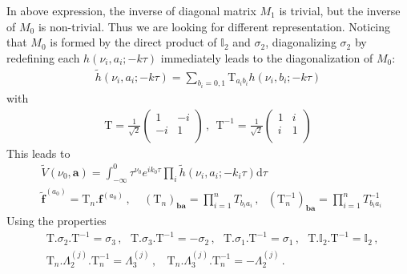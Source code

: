 \documentclass[a4paper,11pt]{article}
\newcommand{\nn}{\nonumber}
\newcommand{\nd}{\mathrm{d}}
\newcommand{\bea}{\begin{eqnarray}}
\newcommand{\eea}{\end{eqnarray}}
\begin{document}
In above expression, the inverse of diagonal matrix $M_1$ is trivial, but
the inverse of  $M_0$ is non-trivial. Thus we are looking for 
different representation.  Noticing that $M_0$ is formed by the direct product of $\mathbb{I}_2$ and $\sigma_2$, diagonalizing  $\sigma_2$ by redefining each $h(\nu_i,a_i;-k\tau)$ immediately leads to the diagonalization of $M_0$:
%
\bea \tilde{h}(\nu_i,a_i;-k\tau) = \sum_{b_i=0,1} \text{T}_{a_i b_i} h(\nu_i,b_i;-k\tau)\eea
% 
with
%
\bea \text{T}=\frac{1}{\sqrt{2}}\left(
\begin{array}{cc}
 1 & -i \\
 -i & 1 \\
\end{array}
\right)\, , ~~\text{T}^{-1}=\frac{1}{\sqrt{2}}\left(
\begin{array}{cc}
 1 & i \\
 i & 1 \\
\end{array}
\right)  \label{eq:T}\eea
%
This leads to
\begin{align}
&\tilde{V}(\nu_0,\bm{a})=\int_{-\infty}^0 \tau^{\nu_0} e^{ik_0 \tau} 
  \prod_i \tilde{h}(\nu_i,a_i;-k_i\tau)\nd \tau \nn\\
&\tilde{\bm{f}}^{(a_0)}=\text{T}_n.\bm{f}^{(a_0)}\, , ~~~~~\left(\text{T}_n\right)_{\bm{b}\bm{a}}=\prod_{i=1}^n T_{b_ia_i}\, ,~~~\left(\text{T}_n^{-1}\right)_{\bm{b}\bm{a}}=\prod_{i=1}^n T^{-1}_{b_ia_i}\, \label{eq:Ta}
\end{align}
Using the properties
\begin{align}
&\text{T}.\sigma_2.\text{T}^{-1}=\sigma_3\,,~~~\text{T}.\sigma_3.\text{T}^{-1}=-\sigma_2 \, , ~~~ \text{T}.\sigma_1.\text{T}^{-1}=\sigma_1 \, , ~~~ \text{T}.\mathbb{I}_2.\text{T}^{-1}=\mathbb{I}_2 \, , \nn\\
&\text{T}_n.\Lambda_2^{(j)}.\text{T}^{-1}_n=\Lambda_3^{(j)}\, ,~~~~\text{T}_n.\Lambda_3^{(j)}.\text{T}^{-1}_n=-\Lambda_2^{(j)} \, .   \label{eq:Tsigmai} 
\end{align}
\end{document}
